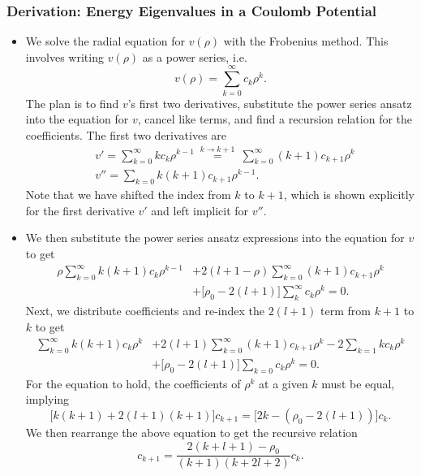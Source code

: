 \documentclass[11pt, a4paper]{article}
\begin{document}
\subsubsection{Derivation: Energy Eigenvalues in a Coulomb Potential}
\begin{itemize}
	\item We solve the radial equation for $ v(\rho) $ with the Frobenius method. This involves writing $ v(\rho) $ as a power series, i.e.
	\begin{equation*}
		v(\rho) = \sum_{k = 0}^{\infty} c_{k}\rho^{k}.
	\end{equation*}
	The plan is to find $ v $'s first two derivatives, substitute the power series ansatz into the equation for $ v $, cancel like terms, and find a recursion relation for the coefficients. The first two derivatives are
	\begin{align*}
		& v' = \sum_{k = 0}^{\infty}kc_{k}\rho^{k-1} \ \stackrel{k\to k+1}{=} \ \sum_{k=0}^{\infty}(k+1)c_{k+1}\rho^{k}\\
		&v'' = \sum_{k = 0} k(k+1)c_{k+1}\rho^{k-1}.
	\end{align*}
	Note that we have shifted the index from $ k $ to $ k + 1 $, which is shown explicitly for the first derivative $ v' $ and left implicit for $ v'' $.
	
	\item We then substitute the power series ansatz expressions into the equation for $ v $ to get
	\begin{align*}
		\rho\sum_{k = 0}^{\infty}k(k+1)c_{k}\rho^{k-1}  &+ 2(l+1-\rho)\sum_{k=0}^{\infty}(k+1)c_{k+1}\rho^{k} \\
		& + \big[\rho_{0} - 2(l+1)\big]\sum_{k}^{\infty} c_{k}\rho^{k} = 0.
	\end{align*}
	Next, we distribute coefficients and re-index the $ 2(l+1) $ term from $ k + 1 $ to $ k $ to get
	\begin{align*}
		\sum_{k = 0}^{\infty}k(k+1)c_{k}\rho^{k}  &+ 2(l+1)\sum_{k=0}^{\infty}(k+1)c_{k+1}\rho^{k} - 2 \sum_{k=1}kc_{k}\rho^{k} \\
		& + \big[\rho_{0} - 2(l+1)\big]\sum_{k=0}c_{k}\rho^{k} = 0.
	\end{align*}
	For the equation to hold, the coefficients of $ \rho^{k} $ at a given $ k $ must be equal, implying
	\begin{equation*}
		\big[k(k+1) + 2(l+1)(k+1)\big]c_{k+1} = \big[2k - (\rho_{0} - 2(l+1))\big]c_{k}.
	\end{equation*}
	We then rearrange the above equation to get the recursive relation
	\begin{equation*}
		c_{k+1} = \frac{2(k+l+1)-\rho_{0}}{(k+1)(k+2l + 2)}c_{k}.
	\end{equation*}
	

\end{itemize}
\end{document}
